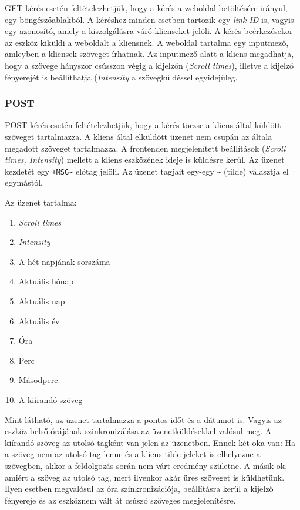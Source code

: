 \documentclass[a4paper, 12pt]{article}
\begin{document}
GET kérés esetén feltételezhetjük, hogy a kérés a weboldal betöltésére irányul, egy böngészőablakból. A kéréshez minden esetben tartozik egy \textit{link ID} is, vagyis egy azonosító, amely a kiszolgálásra váró klienseket jelöli. A kérés beérkezésekor az eszköz kiküldi a weboldalt a kliensnek. A weboldal tartalma egy inputmező, amleyben a kliensek szöveget írhatnak. Az inputmező alatt a kliens megadhatja, hogy a szövege hányszor csússzon végig a kijelzőn (\textit{Scroll times}), illetve a kijelző fényerejét is beállíthatja (\textit{Intensity} a szövegküldéssel egyidejűleg.

\subsubsection{POST}

POST kérés esetén feltételezhetjük, hogy a kérés törzse a kliens által küldött szöveget tartalmazza.
A kliens által elküldött üzenet nem csupán az általa megadott szöveget tartalmazza. A frontenden megjelenített beállítások (\textit{Scroll times, Intensity}) mellett a kliens eszközének ideje is küldésre kerül.
Az üzenet kezdetét egy \texttt{+MSG\~} előtag jelöli. Az üzenet tagjait egy-egy \texttt{\~} (tilde) választja el egymástól.

Az üzenet tartalma:
\begin{enumerate}[nolistsep]
 \item \textit{Scroll times}
 \item \textit{Intensity}
 \item A hét napjának sorszáma
 \item Aktuális hónap
 \item Aktuális nap
 \item Aktuális év
 \item Óra
 \item Perc
 \item Másodperc
 \item A kiírandó szöveg 
\end{enumerate}

Mint látható, az üzenet tartalmazza a pontos időt és a dátumot is. Vagyis az eszköz belső órájának szinkronizálása az üzenetküldésekkel valósul meg. A kiírandó szöveg az utolsó tagként van jelen az üzenetben. Ennek két oka van: Ha a szöveg nem az utolsó tag lenne és a kliens tilde jeleket is elhelyezne a szövegben, akkor a feldolgozás során nem várt eredmény születne. A másik ok, amiért a szöveg az utolsó tag, mert ilyenkor akár üres szöveget is küldhetünk. Ilyen esetben megvalósul az óra szinkronizációja, beállításra kerül a kijelző fényereje és az eszköznem vált át csúszó szöveges megjelenítésre.
\end{document}
